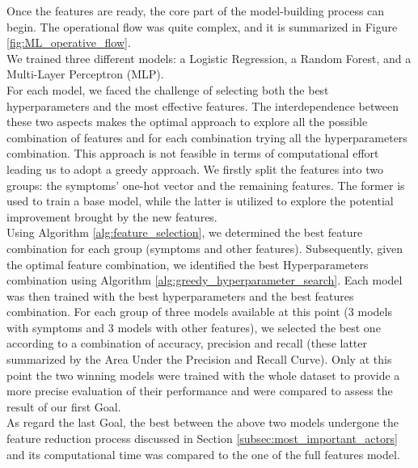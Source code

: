 Once the features are ready, the core part of the model-building process can begin. The operational flow was quite complex,
and it is summarized in Figure \ref{fig:ML_operative_flow}.\\
We trained three different models: a Logistic Regression, a Random Forest, and a Multi-Layer Perceptron (MLP).\\
For each model, we faced the challenge of selecting both the best hyperparameters and the most effective features.
The interdependence between these two aspects makes the optimal approach to explore all the possible combination of features
and for each combination trying all the hyperparameters combination. This approach is not feasible in terms of computational effort
leading us to adopt a greedy approach. We firstly split the features into two
groups: the symptoms' one-hot vector and the remaining features. The former is used to train a base model,
while the latter is utilized to explore the potential improvement brought by the new features.\\
Using Algorithm \ref{alg:feature_selection}, we determined the best feature combination for each group (symptoms and other features).
Subsequently, given the optimal feature combination, we identified the best Hyperparameters combination using Algorithm
\ref{alg:greedy_hyperparameter_search}. Each model was then trained with the best hyperparameters and the best features combination.
For each group of three models available at this point (3 models with symptoms and 3 models with other features), we selected the best one
according to a combination of accuracy, precision and recall (these latter summarized by the Area Under the Precision and Recall Curve).
Only at this point the two winning models were trained with the whole dataset to provide a more precise evaluation of their performance and
were compared to assess the result of our first Goal.\\
As regard the last Goal, the best between the above two models undergone the feature reduction process
discussed in Section \ref{subsec:most_important_actors} and its computational time was compared to the one of the full features model.\\

